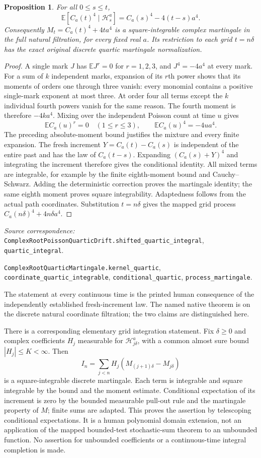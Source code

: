 \documentclass[11pt]{article}
\newtheorem{proposition}[theorem]{Proposition}
\newcommand{\E}{\mathbb E}\newcommand{\Pp}{\mathbb P}
\newcommand{\code}[1]{{\small\nolinkurl{#1}}}
\begin{document}
\begin{proposition}\label{prop:quarticmartingale}
For all $0\leq s\leq t$,
\[
 \E[C_a(t)^4\mid\mathcal H_s^a]
       =C_a(s)^4-4(t-s)a^4.
\]
Consequently $M_t=C_a(t)^4+4ta^4$ is a square-integrable complex
martingale in the full natural filtration, for every fixed real
$a$. Its restriction to each grid $t=n\delta$ has the exact
original discrete quartic martingale normalization.
\end{proposition}
\begin{proof}
A single mark $J$ has $\E J^r=0$ for $r=1,2,3$, and
$J^4=-4a^4$ at every mark. For a sum of $k$ independent marks,
expansion of its $r$th power shows that its moments of orders
one through three vanish: every monomial contains a positive
single-mark exponent at most three. At order four all terms
except the $k$ individual fourth powers vanish for the same
reason. The fourth moment is therefore $-4ka^4$.
Mixing over the independent Poisson count at time $u$ gives
\[
 \E C_a(u)^r=0\quad(1\leq r\leq3),\qquad
 \E C_a(u)^4=-4ua^4.
\]
The preceding absolute-moment bound justifies the mixture and
every finite expansion. The fresh increment $Y=C_a(t)-C_a(s)$
is independent of the entire past and has the law of $C_a(t-s)$.
Expanding $(C_a(s)+Y)^4$ and integrating the increment therefore
gives the conditional identity. All mixed terms are integrable,
for example by the finite eighth-moment bound and
Cauchy--Schwarz. Adding the deterministic correction proves the
martingale identity; the same eighth moment proves square
integrability. Adaptedness follows from the actual path
coordinates. Substitution $t=n\delta$ gives the mapped grid
process $C_a(n\delta)^4+4n\delta a^4$.
\end{proof}
\par\smallskip\begingroup\small\raggedright
\noindent\textit{Source correspondence:}
\code{ComplexRootPoissonQuarticDrift.shifted_quartic_integral},
\code{quartic_integral}.\par\noindent
\code{ComplexRootQuarticMartingale.kernel_quartic},
\code{coordinate_quartic_integrable}, \code{conditional_quartic},
\code{process_martingale}.\par\endgroup
The statement at every continuous time is the printed human
consequence of the independently established fresh-increment
law. The named native theorem is on the discrete natural
coordinate filtration; the two claims are distinguished here.

There is a corresponding elementary grid integration statement.
Fix $\delta\geq0$ and complex coefficients $H_j$ measurable for
$\mathcal H_{j\delta}^a$, with a common almost sure bound
$|H_j|\leq K<\infty$. Then
\[
 I_n=\sum_{j<n}H_j(M_{(j+1)\delta}-M_{j\delta})
\]
is a square-integrable discrete martingale. Each term is
integrable and square integrable by the bound and the moment
estimate. Conditional expectation of its increment is zero by
the bounded measurable pull-out rule and the martingale property
of $M$; finite sums are adapted. This proves the assertion by
telescoping conditional expectations. It is a human polynomial
domain extension, not an application of the mapped bounded-test
stochastic-sum theorem to an unbounded function. No assertion for
unbounded coefficients or a continuous-time integral completion
is made.
\end{document}
